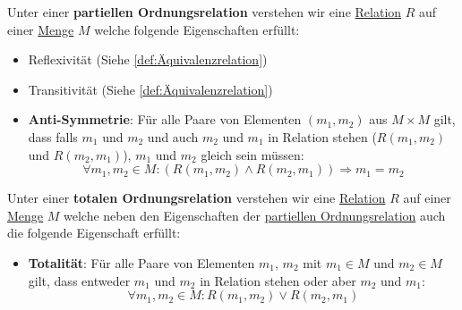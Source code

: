 \documentclass[../../main.tex]{subfiles}
\begin{document}
	\begin{definition}
		\label{def:partielleOrdnungsrelation}
		Unter einer \textbf{partiellen Ordnungsrelation} verstehen wir eine \hyperref[def:Relation]{Relation} $R$ auf einer \hyperref[def:Menge]{Menge} $M$ welche folgende Eigenschaften erfüllt:
		\begin{itemize}
			\item Reflexivität (Siehe \ref{def:Äquivalenzrelation})
			\item Transitivität (Siehe \ref{def:Äquivalenzrelation})
			\item \textbf{Anti-Symmetrie}: Für alle Paare von Elementen $(m_1, m_2)$ aus $M \times M$ gilt, dass falls $m_1$ und $m_2$ und auch $m_2$ und $m_1$ in Relation stehen ($R(m_1,m_2)$ und $R(m_2, m_1)$), $m_1$ und $m_2$ gleich sein müssen: $$\forall m_1, m_2 \in M: (R(m_1,m_2) \land R(m_2, m_1)) \Rightarrow m_1 = m_2$$
		\end{itemize}
	\end{definition}

	\begin{definition}
		Unter einer \textbf{totalen Ordnungsrelation} verstehen wir eine \hyperref[def:Relation]{Relation} $R$ auf einer \hyperref[def:Menge]{Menge} $M$ welche neben den Eigenschaften der \hyperref[def:partielleOrdnungsrelation]{partiellen Ordnungsrelation} auch die folgende Eigenschaft erfüllt:
		\begin{itemize}
			\item \textbf{Totalität}: Für alle Paare von Elementen $m_1$, $m_2$ mit $m_1 \in M$ und $m_2 \in M$ gilt, dass entweder $m_1$ und $m_2$ in Relation stehen oder aber $m_2$ und $m_1$: $$\forall m_1, m_2 \in M: R(m_1,m_2) \lor R(m_2, m_1) $$
		\end{itemize}
	\end{definition}
	
\end{document}

